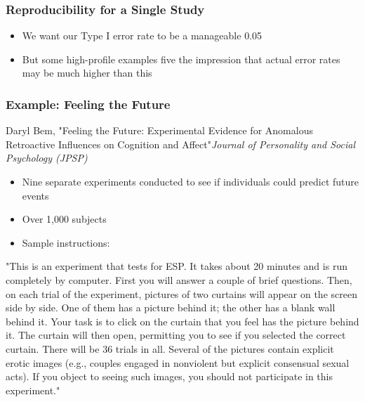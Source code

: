 \documentclass[10pt, block=fill]{beamer}
\begin{document}
\begin{frame}
  \frametitle{Reproducibility for a Single Study}
  
  \begin{itemize}
    \item We want our Type I error rate to be a manageable 0.05
    \item But some high-profile examples five the impression that actual error rates may be much higher than this
  \end{itemize}
    
\end{frame}

\begin{frame}
  \frametitle{Example: Feeling the Future}
  Daryl Bem, "Feeling the Future: Experimental Evidence for Anomalous Retroactive Influences on Cognition and Affect"\textit{Journal of Personality and Social Psychology (JPSP)}
  \begin{itemize}
    \item Nine separate experiments conducted to see if individuals could predict future events
    \item Over 1,000 subjects
    \item Sample instructions:
  \end{itemize}

  \tiny{"This is an experiment that tests for ESP. It takes about 20 minutes and is run completely by computer. First you will answer a couple of brief questions. Then, on each trial of the experiment, pictures of two curtains will appear on the screen side by side. One of them has a picture behind it; the other has a blank wall behind it. Your task is to click on the curtain that you feel has the picture behind it. The curtain will then open, permitting you to see if you selected the correct curtain. There will be 36 trials in all. Several of the pictures contain explicit erotic images (e.g., couples engaged in nonviolent but explicit consensual sexual acts). If you object to seeing such images, you should not participate in this experiment."}

\end{frame}
\end{document}
